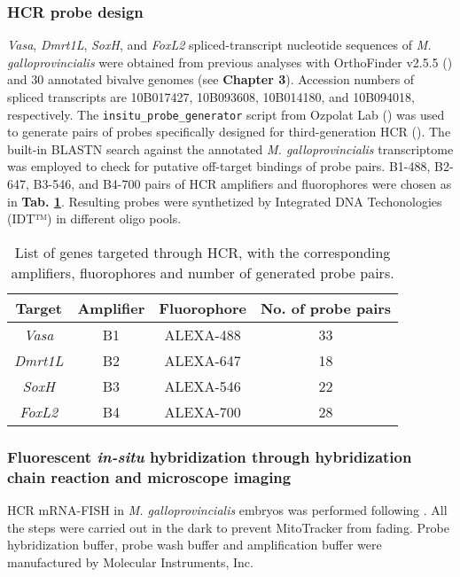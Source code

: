 \subsubsection{HCR probe design} \label{probedesign_MM}
\textit{Vasa}, \textit{Dmrt1L}, \textit{SoxH}, and \textit{FoxL2} spliced-transcript nucleotide sequences of \textit{M. galloprovincialis} were obtained from previous analyses with OrthoFinder v2.5.5 (\textbf{}) and 30 annotated bivalve genomes (see \textbf{Chapter 3}). Accession numbers of spliced transcripts are 10B017427, 10B093608, 10B014180, and 10B094018, respectively. The \verb|insitu_probe_generator| script from Ozpolat Lab (\textbf{}) was used to generate pairs of probes specifically designed for third-generation HCR (\textbf{}). The built-in BLASTN search against the annotated \textit{M. galloprovincialis} transcriptome was employed to check for putative off-target bindings of probe pairs. B1-488, B2-647, B3-546, and B4-700 pairs of HCR amplifiers and fluorophores were chosen as in \textbf{Tab. \ref{tab:probes}}. Resulting probes were synthetized by Integrated DNA Techonologies (IDT™) in different oligo pools.

\begin{table}
	\centering
	\begin{tabular}{@{}cccc@{}}
		\toprule
		\textbf{Target} & \textbf{Amplifier} & \textbf{Fluorophore} & \textbf{No. of probe pairs} \\
		\midrule \midrule
		\textit{Vasa}   & B1                 & ALEXA-488            & 33                          \\
		\textit{Dmrt1L} & B2                 & ALEXA-647            & 18                          \\
		\textit{SoxH}   & B3                 & ALEXA-546            & 22                          \\
		\textit{FoxL2}  & B4                 & ALEXA-700            & 28                          \\
		\bottomrule
	\end{tabular}
	\caption{List of genes targeted through HCR, with the corresponding amplifiers, fluorophores and number of generated probe pairs.}
	\label{tab:probes}
\end{table}

\subsubsection{Fluorescent \textit{in-situ} hybridization through hybridization chain reaction and microscope imaging} \label{chapter4_MM_hcrprotocol}
HCR mRNA-FISH in \textit{M. galloprovincialis} embryos was performed following \textbf{}. All the steps were carried out in the dark to prevent MitoTracker from fading. Probe hybridization buffer, probe wash buffer and amplification buffer were manufactured by Molecular Instruments, Inc.

